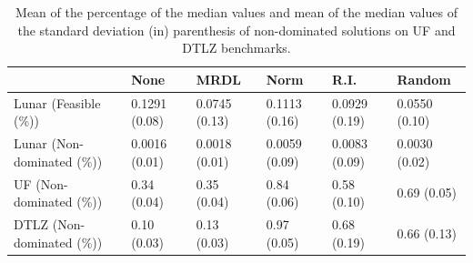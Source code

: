 \begin{table}[!t]
	\begin{tabular}{llllll}
		\cline{6-6}
		\hline
		\rowcolor[gray]{.7} \multicolumn{1}{|l|}{Rates}         & \multicolumn{1}{l|}{None} & \multicolumn{1}{l|}{MRDL} & \multicolumn{1}{l|}{Norm} & \multicolumn{1}{l|}{R.I.} & \multicolumn{1}{l|}{Random} \\ \hline \hline  \hline
		
		Lunar (Feasible (\%))           & 0.1291 (0.08) & 0.0745 (0.13) & 0.1113 (0.16) & 0.0929 (0.19)             & 0.0550 (0.10) \\
		
		\rowcolor[gray]{.95}Lunar (Non-dominated (\%))           & 0.0016 (0.01) &0.0018 (0.01) & 0.0059 (0.09) & 0.0083 (0.09)             & 0.0030 (0.02) \\%
		
		UF (Non-dominated (\%))              & 0.34 (0.04) & 0.35 (0.04) & 0.84 (0.06) & 0.58 (0.10)             & 0.69 (0.05) \\ %
		
		\rowcolor[gray]{.95}DTLZ (Non-dominated (\%))              & 0.10 (0.03) & 0.13 (0.03) & 0.97 (0.05) & 0.68 (0.19)             &  0.66 (0.13) \\ %
		
	\end{tabular}
	\caption{Mean of the percentage of the median values and mean of the median values of the standard deviation (in) parenthesis of non-dominated solutions on UF and DTLZ benchmarks.}
	\label{minor_results}
\end{table}

